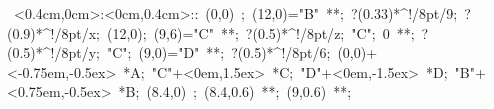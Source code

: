 \hbox{
\xy    <0.4cm,0cm>:<0cm,0.4cm>::
       (0,0) ; (12,0)="B" **\dir{-}; ?(0.33)*^!/8pt/{9};
       ?(0.9)*^!/8pt/{x}; (12,0); (9,6)="C" **\dir{-};
       ?(0.5)*^!/8pt/{z};
       "C"; 0 **\dir{-}; ?(0.5)*^!/8pt/{y}; 
       "C"; (9,0)="D" **\dir{-}; ?(0.5)*^!/8pt/{6}; 
       (0,0)+<-0.75em,-0.5ex> *{A};
       "C"+<0em,1.5ex> *{C};
       "D"+<0em,-1.5ex> *{D};
       "B"+<0.75em,-0.5ex> *{B};
	(8.4,0) ; (8.4,0.6) **\dir{-}; (9,0.6) **\dir{-};
       \endxy}
	   
